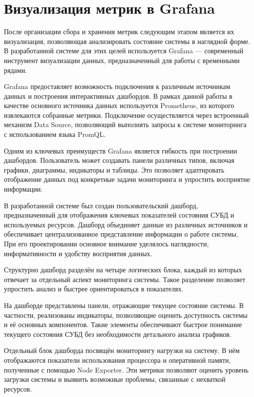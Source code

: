 \section{Визуализация метрик в Grafana} \label{ch2:grafana}

После организации сбора и хранения метрик следующим этапом является их визуализация, позволяющая анализировать состояние системы в наглядной форме. В разработанной системе для этих целей используется Grafana — современный инструмент визуализации данных, предназначенный для работы с временными рядами.

Grafana предоставляет возможность подключения к различным источникам данных и построения интерактивных дашбордов. В рамках данной работы в качестве основного источника данных используется Prometheus, из которого извлекаются собранные метрики. Подключение осуществляется через встроенный механизм Data Source, позволяющий выполнять запросы к системе мониторинга с использованием языка PromQL.

Одним из ключевых преимуществ Grafana является гибкость при построении дашбордов. Пользователь может создавать панели различных типов, включая графики, диаграммы, индикаторы и таблицы. Это позволяет адаптировать отображение данных под конкретные задачи мониторинга и упростить восприятие информации.

В разработанной системе был создан пользовательский дашборд, предназначенный для отображения ключевых показателей состояния СУБД и используемых ресурсов. Дашборд объединяет данные из различных источников и обеспечивает централизованное представление информации о работе системы. При его проектировании основное внимание уделялось наглядности, информативности и удобству восприятия данных.

Структурно дашборд разделён на четыре логических блока, каждый из которых отвечает за отдельный аспект мониторинга системы. Такое разделение позволяет упростить анализ и быстрее ориентироваться в показателях.

На дашборде представлены панели, отражающие текущее состояние системы. В частности, реализованы индикаторы, позволяющие оценить доступность системы и её основных компонентов. Такие элементы обеспечивают быстрое понимание текущего состояния СУБД без необходимости детального анализа графиков.

Отдельный блок дашборда посвящён мониторингу нагрузки на систему. В нём отображаются показатели использования процессора и оперативной памяти, полученные с помощью Node Exporter. Эти метрики позволяют оценить уровень загрузки системы и выявить возможные проблемы, связанные с нехваткой ресурсов.


